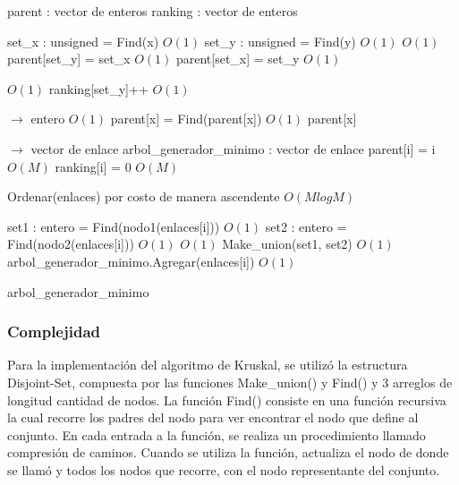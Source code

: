 \documentclass[a4paper, 10pt, twoside]{article}
\newenvironment{pseudo}[1][]{%
    \vspace{0.5em}%
    \begin{algorithmic}%
}
{%
    \end{algorithmic}%
    \vspace{0.5em}%
}
\newcommand{\Ode}[1]{\hfill $O(#1)$}
\begin{document}
\begin{pseudo}

\State parent : vector de enteros
\State ranking : vector de enteros

    \State set\_x : unsigned = Find(x)                   	\Ode{1}
    \State set\_y : unsigned = Find(y)                    	\Ode{1}
                    \Ode{1}
    \State parent[set\_y] = set\_x                    		\Ode{1}
    \Else
        \State parent[set\_x] = set\_y                 	  	\Ode{1}
    \EndIf
    
                     \Ode{1}
        \State ranking[set\_y]++                     		\Ode{1}
    \EndIf
\EndProcedure

 $\rightarrow$ entero
                               			\Ode{1}
        \State parent[x] = Find(parent[x])                  \Ode{1}
    \EndIf
    \Return parent[x]
\EndProcedure

 $\rightarrow$ vector de enlace
    \State arbol\_generador\_minimo : vector de enlace
     parent[i] = i \EndFor						\Ode{M}
	 ranking[i] = 0 \EndFor						\Ode{M}

    \State Ordenar(enlaces) por costo de manera ascendente					\Ode{M log M}

        \State set1 : entero = Find(nodo1(enlaces[i]))						\Ode{1}
        \State set2 : entero = Find(nodo2(enlaces[i]))						\Ode{1}
        													\Ode{1}
            \State Make\_union(set1, set2)									\Ode{1}
            \State arbol\_generador\_minimo.Agregar(enlaces[i])				\Ode{1}
        \EndIf        
    \EndFor

    \Return arbol\_generador\_minimo
\EndProcedure
\end{pseudo}



\subsubsection{Complejidad}

Para la implementación del algoritmo de Kruskal, se utilizó la estructura Disjoint-Set, compuesta por las funciones Make\_union() y Find() y 3 arreglos de longitud cantidad de nodos.
La función Find() consiste en una función recursiva la cual recorre los padres del nodo para ver encontrar el nodo que define al conjunto. En cada entrada a la función, se realiza un procedimiento llamado compresión de caminos. Cuando se utiliza la función, actualiza el nodo de donde se llamó y todos los nodos que recorre, con el nodo representante del conjunto.
\end{document}
